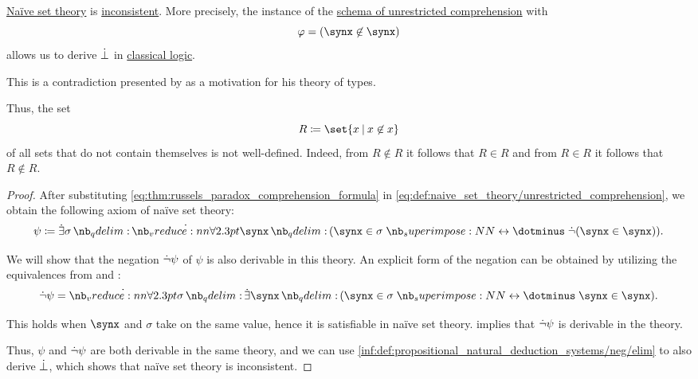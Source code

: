 \begin{theorem}\label{thm:russels_paradox}
  \hyperref[def:naive_set_theory]{Na\"ive set theory} is \hyperref[def:first_order_theory/consistent]{inconsistent}. More precisely, the instance of the \hyperref[def:naive_set_theory/unrestricted_comprehension]{schema of unrestricted comprehension} with
  \begin{equation}\label{eq:thm:russels_paradox_comprehension_formula}
    \varphi = (\synx \not\in \synx)
  \end{equation}
  allows us to derive \( \dot{\bot} \) in \hyperref[con:classical_logic]{classical logic}.
\end{theorem}
\begin{comments}
  \item This is a contradiction presented by  as a motivation for his theory of types.
\end{comments}
\begin{comments}
  \item Thus, the set
  \begin{equation}\label{eq:thm:russels_paradox_set}
    R \coloneqq \set{ x \given x \not\in x }
  \end{equation}
  of all sets that do not contain themselves is not well-defined. Indeed, from \( R \not\in R \) it follows that \( R \in R \) and from \( R \in R \) it follows that \( R \not\in R \).
\end{comments}
\begin{proof}
  After substituting \eqref{eq:thm:russels_paradox_comprehension_formula} in \eqref{eq:def:naive_set_theory/unrestricted_comprehension}, we obtain the following axiom of na\"ive set theory:
  \begin{equation}\label{eq:thm:russels_paradox_comprehension_axiom}
    \psi \coloneqq \qexists \sigma \qforall \synx (\synx \in \sigma \syniff \synneg (\synx \in \synx)).
  \end{equation}

  We will show that the negation \( \dot{\neg}\psi \) of \( \psi \) is also derivable in this theory. An explicit form of the negation can be obtained by utilizing the equivalences from  and :
  \begin{equation*}
    \synneg\psi = \qforall \sigma \qexists \synx (\synx \in \sigma \syniff \synx \in \synx).
  \end{equation*}

  This holds when \( \synx \) and \( \sigma \) take on the same value, hence it is satisfiable in na\"ive set theory.  implies that \( \dot{\neg}\psi \) is derivable in the theory.

  Thus, \( \psi \) and \( \dot{\neg}\psi \) are both derivable in the same theory, and we can use \ref{inf:def:propositional_natural_deduction_systems/neg/elim} to also derive \( \dot{\bot} \), which shows that na\"ive set theory is inconsistent.
\end{proof}

